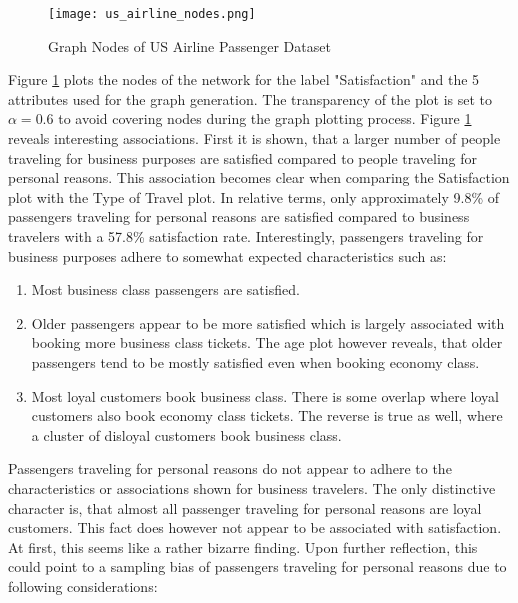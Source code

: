   \begin{figure}[h]
	  \centering
	  \texttt{[image: us\_airline\_nodes.png]}
	  \caption{Graph Nodes of US Airline Passenger Dataset}
      \label{fig:us_airline_nodes}
  \end{figure}

  \noindent Figure \ref{fig:us_airline_nodes} plots the nodes of the network
  for the label "Satisfaction" and the 5 attributes used for the graph
  generation. The transparency of the plot is set to $\alpha = 0.6$ to avoid 
  covering nodes during the graph plotting process. Figure
  \ref{fig:us_airline_nodes} reveals interesting associations. First it is
  shown, that a larger number of people traveling for business purposes are 
  satisfied compared to people traveling for personal reasons. This association
  becomes clear when comparing the Satisfaction plot with the Type of Travel
  plot. In relative terms, only approximately 9.8\% of passengers traveling for 
  personal reasons are satisfied compared to business travelers with a 57.8\% 
  satisfaction rate. Interestingly, passengers traveling for business purposes
  adhere to somewhat expected characteristics such as:

  \begin{enumerate}
    \item Most business class passengers are satisfied. 
    \item Older passengers appear to be more satisfied which is largely
      associated with booking more business class tickets. The age plot however 
      reveals, that older passengers tend to be mostly satisfied even when 
      booking economy class.
    \item Most loyal customers book business class. There is some overlap where 
      loyal customers also book economy class tickets. The reverse is true as 
      well, where a cluster of disloyal customers book business class. 
  \end{enumerate}
  
  \noindent Passengers traveling for personal reasons do not appear to adhere
  to the characteristics or associations shown for business travelers. The only
  distinctive character is, that almost all passenger traveling for personal
  reasons are loyal customers. This fact does however not appear to be
  associated with satisfaction. At first, this seems like a rather bizarre 
  finding. Upon further reflection, this could point to a sampling bias of 
  passengers traveling for personal reasons due to following considerations:

